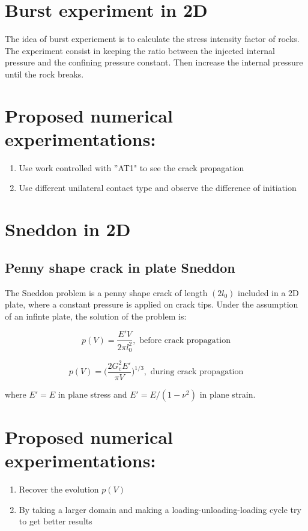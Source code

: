 \documentclass[10pt,oneside]{report}
\begin{document}
\section{Burst experiment in 2D}
The idea of burst experiement is to calculate the stress intensity factor of rocks. The experiment consist in keeping the ratio between the injected internal pressure and the confining pressure constant. Then increase the internal pressure until the rock breaks.

\section*{Proposed numerical experimentations:}
\begin{enumerate}
\item Use work controlled with ”AT1" to see the crack propagation
\item Use different unilateral contact type and observe the difference of initiation
\end{enumerate}

\section{Sneddon in 2D}

\subsection{Penny shape crack in plate Sneddon}
The Sneddon problem is a penny shape crack of length $(2 l_0)$ included in a 2D plate, where a constant pressure is applied on crack tips. Under the assumption of an infinte plate, the solution of the problem is:

$$ p(V) = \frac{E'V}{2\pi l_0^2}, \text{  before crack propagation}$$

$$ p(V) = \Big( \frac{2G_c^2 E'}{\pi V} \Big)^{1/3}, \text{  during crack propagation}$$

where $E'=E$ in plane stress and $E'=E/(1-\nu^2)$ in plane strain.

\section*{Proposed numerical experimentations:}
\begin{enumerate}
\item Recover the evolution $p(V)$
\item By taking a larger domain and making a loading-unloading-loading cycle try to get better results
\end{enumerate}
\end{document}
